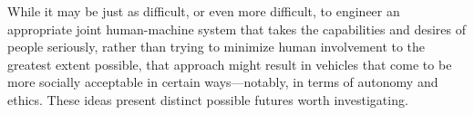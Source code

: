 While it may be just as difficult, or even more difficult, to engineer
an appropriate joint human-machine system that takes the capabilities
and desires of people seriously, rather than trying to minimize human
involvement to the greatest extent possible, that approach might
result in vehicles that 
come to be more socially acceptable in certain ways---notably, in
terms of autonomy and ethics. These ideas present distinct possible
futures worth investigating.




